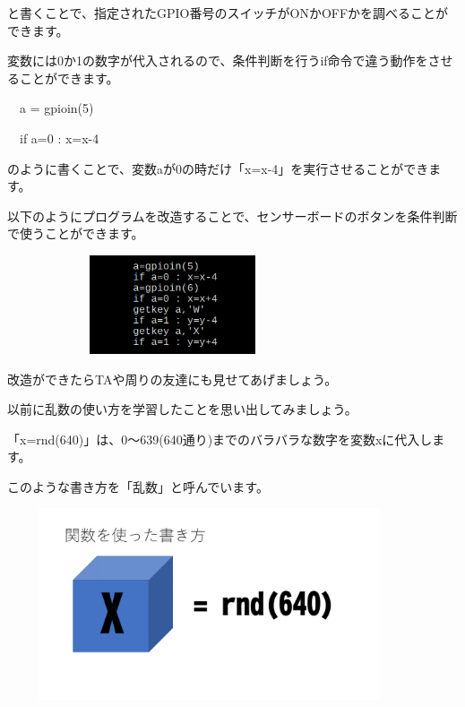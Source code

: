 \documentclass[a4paper,dvipdfmx]{jarticle}
\newcommand\textstyleqwerty[1]{#1}
\begin{document}
と書くことで、指定されたGPIO番号のスイッチがONかOFFかを調べることができます。

変数には0か1の数字が代入されるので、条件判断を行うif命令で違う動作をさせることができます。


\bigskip

\ \ a = gpioin(5)

\ \ if a=0 : x=x-4


\bigskip

のように書くことで、変数aが0の時だけ「x=x-4」を実行させることができます。


\bigskip

以下のようにプログラムを改造することで、センサーボードのボタンを条件判断で使うことができます。


\bigskip



\begin{center}
\includegraphics[width=9.76cm,height=2.91cm]{text04-img/text04-img038.png}

\end{center}

\bigskip


\bigskip


\bigskip


\bigskip


\bigskip


\bigskip


\bigskip


\bigskip

\textstyleqwerty{改造ができたらTAや周りの友達にも見せてあげましょう。}


\bigskip

以前に乱数の使い方を学習したことを思い出してみましょう。

「x=rnd(640)」は、0〜639(640通り)までのバラバラな数字を変数xに代入します。

このような書き方を「乱数」と呼んでいます。


\bigskip



\begin{center}
\includegraphics[width=11.906cm,height=5.662cm]{text04-img/text04-img039.png}

\end{center}
\end{document}
